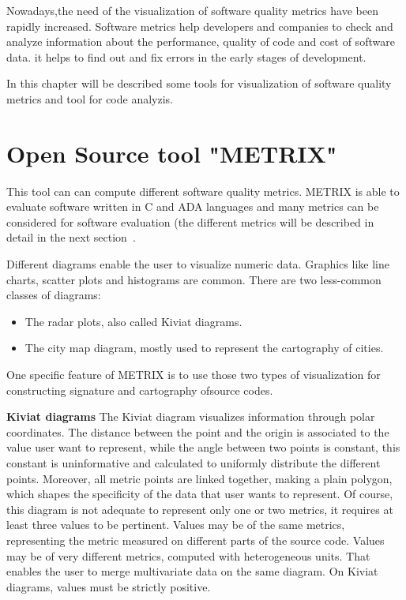 Nowadays,the need of the visualization of software quality metrics have been rapidly increased. Software metrics help developers and companies to check and analyze information about the performance, quality of code and cost of software data. it helps to find out and fix errors in the early stages of development.

In this chapter will be described some tools for visualization of software quality metrics and tool for code analyzis.

\section{Open Source tool "METRIX"}

This tool can can compute different software quality 
metrics. METRIX is  able  to  evaluate  software  written  in  C  and  ADA  languages  and  many  metrics  can  be  considered  for  software evaluation (the different metrics will be described in detail in the next section~\cite{metrix}. 

Different  diagrams  enable  the  user  to  visualize  numeric  data.  Graphics  like  line  charts,  scatter  plots  and  
histograms are common. 
There are two less-common classes of diagrams: 
\begin{itemize}
	\item The radar plots, also called Kiviat diagrams.
	\item The city map diagram, mostly used to represent the cartography of 
	cities.
\end{itemize}
One specific feature of METRIX is to use those two types of visualization for constructing signature and cartography ofsource codes.
 
\textbf{Kiviat diagrams}
The Kiviat diagram visualizes information through polar coordinates. The  distance between the  point and  the origin is associated to the value user want to represent, while the angle between two points is constant, this constant is uninformative  and  calculated  to  uniformly  distribute  the  different  points.  Moreover, all metric points are linked  
together, making a plain polygon, which shapes the specificity of the data that user wants to represent. Of  course, this diagram is not adequate to represent only one or two metrics, it requires at least three values to be pertinent. Values may be of the same metrics, representing the metric measured on different parts of the source code. Values may be 
of  very  different  metrics,  computed  with  heterogeneous  units.  That  enables  the  user  to  merge  multivariate  data  on  the same diagram. On Kiviat diagrams, values must be strictly positive. 

